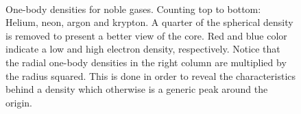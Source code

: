 \begin{figure}
\begin{center}
     \\
  \caption{One-body densities for noble gases. Counting top to bottom: Helium, neon, argon and krypton. A quarter of the spherical density is removed to present a better view of the core. Red and blue color indicate a low and high electron density, respectively. Notice that the radial one-body densities in the right column are multiplied by the radius squared. This is done in order to reveal the characteristics behind a density which otherwise is a generic peak around the origin.}
  \label{fig:OBD_noble_Atoms_2D_combo}
 \end{center}
\end{figure}
 
 
